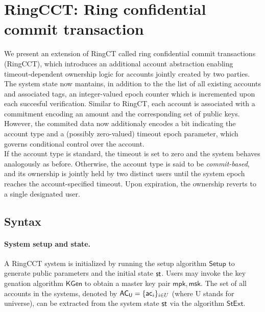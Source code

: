 
\section{RingCCT: Ring confidential commit transaction}
We present an extension of RingCT called ring confidential commit transactions (RingCCT), 
which introduces an additional account abstraction enabling timeout-dependent ownership logic for accounts jointly created by two parties. The system state now mantains, in addition to the the list of all existing accounts and associated tags, an integer-valued epoch counter which is incremented upon each succesful verification. Similar to RingCT, each account is associated with a commitment encoding an amount and the corresponding set of public keys. However, the commited data now additionaly encodes a bit indicating the account type and a (possibly zero-valued) timeout epoch parameter, which governs conditional control over the account. \\ 
If the account type is standard, the timeout is set to zero and the system behaves analogously as before. Otherwise, the account type is said to be \textit{commit-based}, and its ownership is jointly held by two distinct users until the system epoch reaches the account-specified timeout. Upon expiration, the ownership reverts to a single designated user. 

\subsection{Syntax}
\paragraph*{System setup and state.} A RingCCT system is initialized by running the setup algorithm $\mathsf{Setup}$ to generate public parameters and the initial state $\st$. Users may invoke the key genation algorithm $\mathsf{KGen}$ to obtain a master key pair $\mathsf{mpk}, \mathsf{msk}$. 
The set of all accounts in the systems, denoted by $\mathsf{AC_U} = \{ \mathsf{ac}_i \}_{i\in U}$ (where U stands for universe), can be extracted from the system state $\st$ via the algorithm $\mathsf{StExt}$. 

